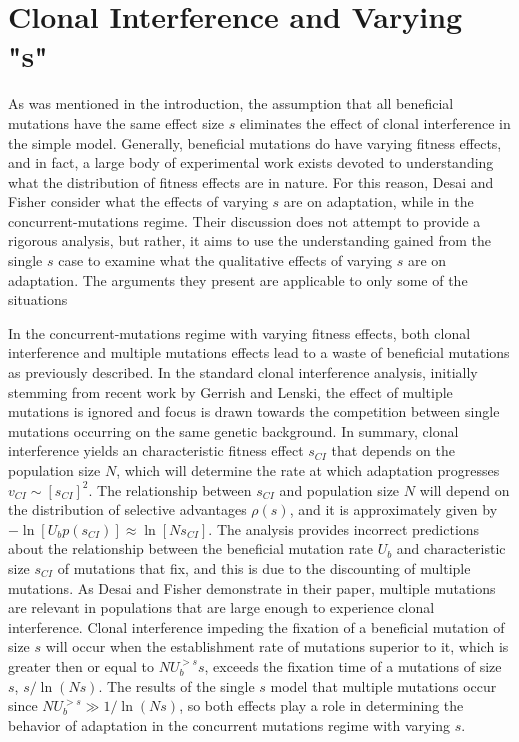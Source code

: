 \documentclass[12pt, one column]{article}
\begin{document}
\section*{Clonal Interference and Varying "s"}
As was mentioned in the introduction, the assumption that all beneficial mutations have the same effect size $s$ eliminates the effect of clonal interference in the simple model.  Generally, beneficial mutations do have varying fitness effects, and in fact, a large body of experimental work exists devoted to understanding what the distribution of fitness effects are in nature.  For this reason, Desai and Fisher consider what the effects of varying $s$ are on adaptation, while in the concurrent-mutations regime.  Their discussion does not attempt to provide a rigorous analysis, but rather, it aims to use the understanding gained from the single $s$ case to examine what the qualitative effects of varying $s$ are on adaptation.  The arguments they present are applicable to only some of the situations

In the concurrent-mutations regime with varying fitness effects, both clonal interference and multiple mutations effects lead to a waste of beneficial mutations as previously described.  In the standard clonal interference analysis, initially stemming from recent work by Gerrish and Lenski, the effect of multiple mutations is ignored and focus is drawn towards the competition between single mutations occurring on the same genetic background.  In summary, clonal interference yields an characteristic fitness effect $s_{CI}$ that depends on the population size $N$, which will determine the rate at which adaptation progresses $v_{CI} \sim [s_{CI}]^2$.  The relationship between $s_{CI}$ and population size $N$ will depend on the distribution of selective advantages $\rho(s)$, and it is approximately given by $-\ln[U_b p(s_{CI})] \approx \ln[N s_{CI}]$.  The analysis provides incorrect predictions about the relationship between the beneficial mutation rate $U_b$ and characteristic size $s_{CI}$ of mutations that fix, and this is due to the discounting of multiple mutations.  As Desai and Fisher demonstrate in their paper, multiple mutations are relevant in populations that are large enough to experience clonal interference.  Clonal interference impeding the fixation of a beneficial mutation of size $s$ will occur when the establishment rate of mutations superior to it, which is greater then or equal to $NU_b^{>s}s$, exceeds the fixation time of a mutations of size $s$, $s/\ln(Ns)$.  The results of the single $s$ model that multiple mutations occur since $NU_b^{>s} \gg 1/\ln(Ns)$, so both effects play a role in determining the behavior of adaptation in the concurrent mutations regime with varying $s$.
\end{document}
